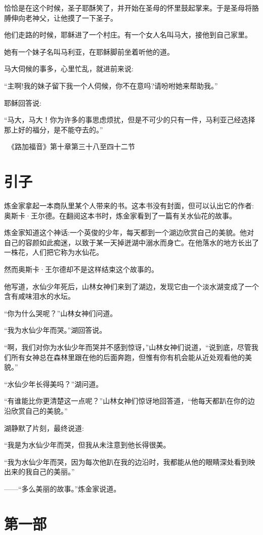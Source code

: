 \documentclass[twoside,openany]{book}
\newcommand{\kai}[1]{{\CJKfamily{kai}#1}}
\begin{document}
恰恰是在这个时候，圣子耶酥笑了，并开始在圣母的怀里鼓起掌来。于是圣母将胳膊伸向老神父，让他摸了一下圣子。

\newpage
{\kai {他们走路的时候，耶稣进了一个村庄。有一个女人名叫马大，接他到自己家里。

她有一个妹子名叫马利亚，在耶稣脚前坐着听他的道。

马大伺候的事多，心里忙乱，就进前来说:

“主啊!我的妹子留下我一个人伺候，你不在意吗?请吩咐她来帮助我。”

耶稣回答说:

“马大，马大！你为许多的事思虑烦扰，但是不可少的只有一件，马利亚己经选择那上好的福分，是不能夺去的。”}}

\ \hfill《路加福音》第十章第三十八至四十二节
\chapter*{引子}
炼金家拿起一本商队里某个人带来的书。这本书没有封面，但可以认出它的作者:奥斯卡·王尔德。在翻阅这本书时，炼金家看到了一篇有关水仙花的故事。

炼金家知道这个神话:一个英俊的少年，每天都到一个湖边欣赏自己的美貌。他对自己的容颜如此痴迷，以致于某一天掉迸湖中溺水而身亡。在他落水的地方长出了一株花，人们把它称为水仙花。

然而奥斯卡·王尔德却不是这样结束这个故事的。

他写道，水仙少年死后，山林女神们来到了湖边，发现它由一个淡水湖变成了一个含有咸味泪水的水坛。

“你为什么哭呢？”山林女神们问道。

“我为水仙少年而哭。”湖回答说。

“啊，我们对你为水仙少年而哭并不感到惊讶，”山林女神们说道，“说到底，尽管我们所有女神总在森林里跟在他的后面奔跑，但惟有你有机会能从近处观看他的美貌。”

“水仙少年长得美吗？”湖问道。

“有谁能比你更清楚这一点呢？”山林女神们惊讶地回答道，“他每天都趴在你的边沿欣赏自己的美貌。”

湖静默了片刻，最终说道:

“我是为水仙少年而哭，但我从未注意到他长得很美。

“我为水仙少年而哭，因为每次他趴在我的边沿时，我都能从他的眼睛深处看到映出来的我自己的美丽。”

——“多么美丽的故事。”炼金家说道。

\chapter{第一部}\label{ch1}
\end{document}
